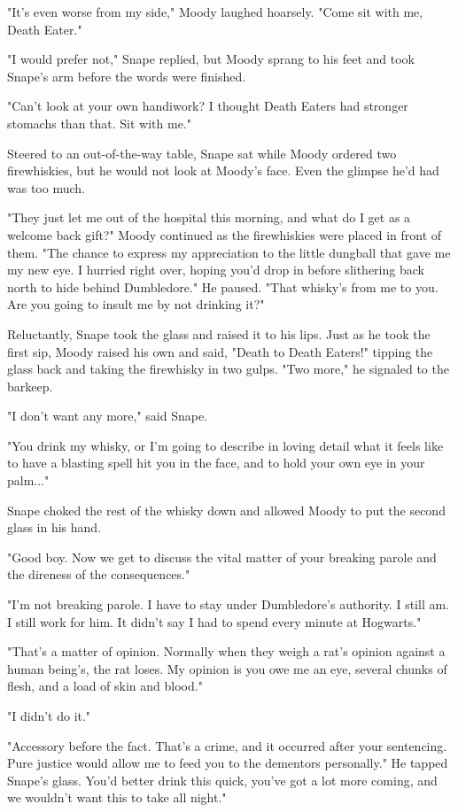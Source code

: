 "It's even worse from my side," Moody laughed hoarsely. "Come sit with me, Death Eater."

"I would prefer not," Snape replied, but Moody sprang to his feet and took Snape's arm before the words were finished.

"Can't look at your own handiwork? I thought Death Eaters had stronger stomachs than that. Sit with me."

Steered to an out-of-the-way table, Snape sat while Moody ordered two firewhiskies, but he would not look at Moody's face. Even the glimpse he'd had was too much.

"They just let me out of the hospital this morning, and what do I get as a welcome back gift?" Moody continued as the firewhiskies were placed in front of them. "The chance to express my appreciation to the little dungball that gave me my new eye. I hurried right over, hoping you'd drop in before slithering back north to hide behind Dumbledore." He paused. "That whisky's from me to you. Are you going to insult me by not drinking it?"

Reluctantly, Snape took the glass and raised it to his lips. Just as he took the first sip, Moody raised his own and said, "Death to Death Eaters!" tipping the glass back and taking the firewhisky in two gulps. "Two more," he signaled to the barkeep.

"I don't want any more," said Snape.

"You drink my whisky, or I'm going to describe in loving detail what it feels like to have a blasting spell hit you in the face, and to hold your own eye in your palm..."

Snape choked the rest of the whisky down and allowed Moody to put the second glass in his hand.

"Good boy. Now we get to discuss the vital matter of your breaking parole and the direness of the consequences."

"I'm not breaking parole. I have to stay under Dumbledore's authority. I still am. I still work for him. It didn't say I had to spend every minute at Hogwarts."

"That's a matter of opinion. Normally when they weigh a rat's opinion against a human being's, the rat loses. My opinion is you owe me an eye, several chunks of flesh, and a load of skin and blood."

"I didn't do it."

"Accessory before the fact. That's a crime, and it occurred after your sentencing. Pure justice would allow me to feed you to the dementors personally." He tapped Snape's glass. You'd better drink this quick, you've got a lot more coming, and we wouldn't want this to take all night."

